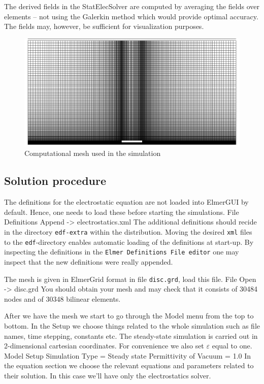 The derived fields in the StatElecSolver are computed 
by averaging the fields over elements -- not using the 
Galerkin method which would provide optimal accuracy. The fields 
may, however, be sufficient for visualization purposes. 



\begin{figure}[h]
\centering
\includegraphics[width=120 mm]{mesh}
\caption{Computational mesh used in the simulation}\label{fg:es_geometry}
\end{figure}  




\subsection*{Solution procedure}

The definitions for the electrostatic equation are not loaded into ElmerGUI by default. Hence, 
one needs to load these before starting the simulations.
\ttbegin
File 
  Definitions
    Append -> electrostatics.xml
\ttend
The additional definitions should recide in the directory \texttt{edf-extra} within the distribution.
Moving the desired \texttt{xml} files to the \texttt{edf}-directory enables automatic loading of the 
definitions at start-up. By inspecting the definitions in the \texttt{Elmer Definitions File editor} one
may inspect that the new definitions were really appended. 


The mesh is given in ElmerGrid format in file \texttt{disc.grd}, load this file.
\ttbegin
File 
  Open -> disc.grd
\ttend
You should obtain your mesh and may check that it consists of 30484 nodes and of 30348 bilinear elements.


After we have the mesh we start to go through the Model menu from the top to bottom. 
In the Setup we choose things related to the whole simulation such as file names, 
time stepping, constants etc.
The steady-state simulation is carried out in 2-dimensional cartesian
coordinates. For convenience we also set $\varepsilon$ equal to one. 
\ttbegin
Model
  Setup 
    Simulation Type = Steady state
    Permittivity of Vacuum = 1.0
\ttend
In the equation section we choose the relevant equations and parameters related to their solution. 
In this case we'll have only the electrostatics solver. 


